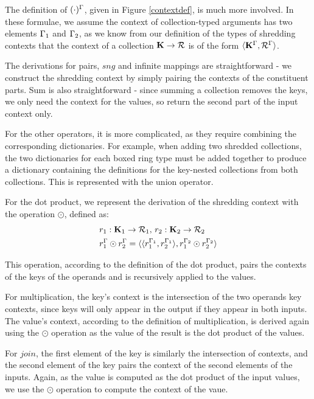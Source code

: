 {{{The definition of $(\cdot)^\Gamma$, given in Figure \ref{contextdef}, is much more involved. In these formulae, we assume the context of collection-typed arguments has two elements $\Gamma_1$ and $\Gamma_2$, as we know from our definition of the types of shredding contexts that the context of a collection $\mathbf{K} \rightarrow \mathcal{R}$ is of the form $\langle \mathbf{K}^\Gamma, \mathcal{R}^\Gamma \rangle$.

The derivations for pairs, $sng$ and infinite mappings are straightforward - we construct the shredding context by simply pairing the contexts of the constituent parts. Sum is also straightforward - since summing a collection removes the keys, we only need the context for the values, so return the second part of the input context only.

For the other operators, it is more complicated, as they require combining the corresponding dictionaries. For example, when adding two shredded collections, the two dictionaries for each boxed ring type must be added together to produce a dictionary containing the definitions for the key-nested collections from both collections. This is represented with the union operator.

For the dot product, we represent the derivation of the shredding context with the operation $\odot$, defined as:
\begin{equation*}
\begin{split}
&r_1: \mathbf{K}_1 \rightarrow \mathcal{R}_1\textrm{, }r_2: \mathbf{K}_2 \rightarrow \mathcal{R}_2 \\
&r_1^\Gamma \odot r_2^\Gamma = \langle \langle r_1^{\Gamma_1}, r_2^{\Gamma_1} \rangle, r_1^{\Gamma_2} \odot r_2^{\Gamma_2} \rangle
\end{split}
\end{equation*}

This operation, according to the definition of the dot product, pairs the contexts of the keys of the operands and is recursively applied to the values.

For multiplication, the key's context is the intersection of the two operands key contexts, since keys will only appear in the output if they appear in both inputs. The value's context, according to the definition of multiplication, is derived again using the $\odot$ operation as the value of the result is the dot product of the values.

For $join$, the first element of the key is similarly the intersection of contexts, and the second element of the key pairs the context of the second elements of the inputs. Again, as the value is computed as the dot product of the input values, we use the $\odot$ operation to compute the context of the vaue.

}}}
